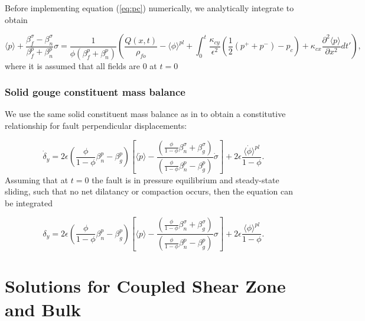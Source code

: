 \documentclass[draft]{agujournal2019}
\begin{document}
Before implementing equation (\ref{eq:pc}) numerically, we analytically integrate to obtain

\begin{equation}
      \langle {p} \rangle + \frac{\beta_f^\sigma - \beta_n^{\sigma}}{\beta_f^p + \beta_n^p } {\sigma}    = \frac{1}{\phi(\beta_f^p + \beta_n^p)} \left( \frac{{Q}(x,t)}{\rho_{fo}}  - \langle {\phi} \rangle^{pl} +  \int_0^t \frac{\kappa_{cy}}{\epsilon^2} (\frac{1}{2}(p^+ + p^-) - p_c) + \kappa_{cx} \frac{\partial^2 \langle p \rangle}{\partial x^2} dt' \right),
     \label{eq:pcI}
\end{equation}	
where it is assumed that all fields are 0 at $t=0$

\subsubsection{Solid gouge constituent mass balance}

We use the same solid constituent mass balance as in  to obtain a constitutive relationship for fault perpendicular displacements:

\begin{equation}
     \dot{\delta}_y =  2 \epsilon \left( \frac{ \phi }{1 - \phi} \beta_n^p - \beta_g^p \right) \left[  \langle \dot{p} \rangle  - \frac{ \left( \frac{ \phi }{1 - \phi} \beta_n^{\sigma}  +    \beta_g^\sigma \right)}{\left( \frac{ \phi }{1 - \phi} \beta_n^p - \beta_g^p \right)} \dot{\sigma}  \right] + 2 \epsilon \frac{ \langle \dot{\phi} \rangle^{pl}}{1 - \phi}.
\end{equation}
Assuming that at $t=0$ the fault is in pressure equilibrium and steady-state sliding, such that no net dilatancy or compaction occurs, then the equation can be integrated

\begin{equation}
     {\delta}_y =  2 \epsilon \left( \frac{ \phi }{1 - \phi} \beta_n^p - \beta_g^p \right) \left[  \langle {p} \rangle  - \frac{ \left( \frac{ \phi }{1 - \phi} \beta_n^{\sigma}  +    \beta_g^\sigma \right)}{\left( \frac{ \phi }{1 - \phi} \beta_n^p - \beta_g^p \right)} {\sigma}  \right] + 2 \epsilon \frac{ \langle {\phi} \rangle^{pl}}{1 - \phi}.
     \label{eq:dy}
\end{equation}



\section{Solutions for Coupled Shear Zone and Bulk} \label{sec:porosol}
\end{document}
